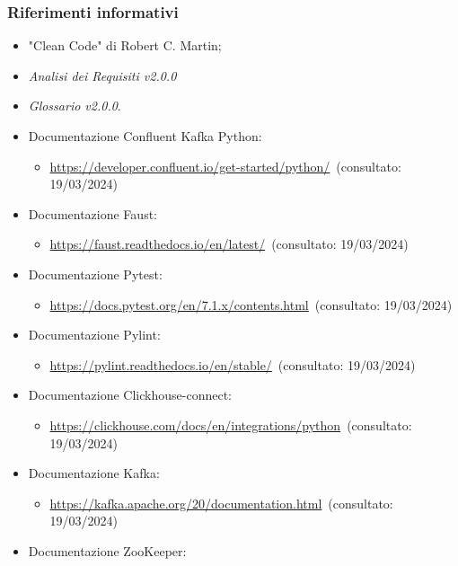 \subsubsection{Riferimenti informativi}
\begin{itemize}
    \item "Clean Code" di Robert C. Martin;
    \item \textit{Analisi dei Requisiti v2.0.0}
    \item \textit{Glossario v2.0.0}.
    \item Documentazione Confluent Kafka Python:
    \begin{itemize}
        \item \url{https://developer.confluent.io/get-started/python/}~(consultato: 19/03/2024)
    \end{itemize}
    \item Documentazione Faust: 
    \begin{itemize}
        \item \url{https://faust.readthedocs.io/en/latest/}~(consultato: 19/03/2024)
    \end{itemize}
    \item Documentazione Pytest: 
    \begin{itemize}
        \item \url{https://docs.pytest.org/en/7.1.x/contents.html}~(consultato: 19/03/2024)
    \end{itemize}
    \item Documentazione Pylint: 
    \begin{itemize}
        \item \url{https://pylint.readthedocs.io/en/stable/}~(consultato: 19/03/2024)
    \end{itemize}
    \item Documentazione Clickhouse-connect: 
    \begin{itemize}
        \item \url{https://clickhouse.com/docs/en/integrations/python}~(consultato: 19/03/2024)
    \end{itemize}
    \item Documentazione Kafka: 
    \begin{itemize}
        \item \url{https://kafka.apache.org/20/documentation.html}~(consultato: 19/03/2024)
    \end{itemize}
    \item Documentazione ZooKeeper: 

\end{itemize}
